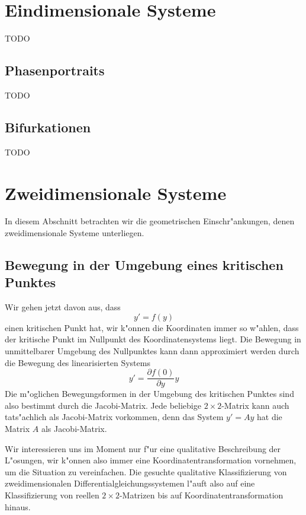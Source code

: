 %
%
\section{Eindimensionale Systeme}
TODO

%
%
\subsection{Phasenportraits}
TODO

%
%
\subsection{Bifurkationen}
TODO

%
%
\section{Zweidimensionale Systeme}
In diesem Abschnitt betrachten wir die geometrischen Einschr"ankungen, denen
zweidimensionale Systeme unterliegen.

%
%
\subsection{Bewegung in der Umgebung eines kritischen Punktes}
Wir gehen jetzt davon aus, dass 
\[
y'=f(y)
\]
einen kritischen Punkt hat, wir k"onnen die Koordinaten immer so w"ahlen,
dass der kritische Punkt im Nullpunkt des Koordinatensystems liegt.
Die Bewegung in unmittelbarer Umgebung des Nullpunktes kann dann approximiert
werden durch die Bewegung des linearisierten Systems
\[
y'=\frac{\partial f(0)}{\partial y}y
\]
Die m"oglichen Bewegungsformen in der Umgebung des kritischen Punktes
sind also bestimmt durch die Jacobi-Matrix.
Jede beliebige $2\times 2$-Matrix kann auch tats"achlich als Jacobi-Matrix
vorkommen, denn das System
$
y'=Ay
$
hat die Matrix $A$ als Jacobi-Matrix.

Wir interessieren uns im Moment nur f"ur eine qualitative Beschreibung
der L"osungen, wir k"onnen also immer eine Koordinatentransformation
vornehmen, um die Situation zu vereinfachen.
Die gesuchte qualitative Klassifizierung von zweidimensionalen
Differentialgleichungssystemen l"auft also auf eine Klassifizierung
von reellen $2\times 2$-Matrizen bis auf Koordinatentransformation
hinaus.


